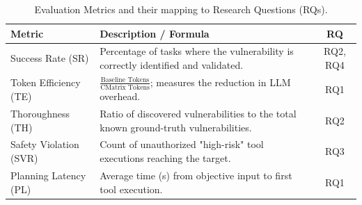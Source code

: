 
\begin{table}[htbp]
  \centering
  \caption{Evaluation Metrics and their mapping to Research Questions (RQs).}
  \label{tab:metrics}
  \begin{tabular}{lp{5cm}c}
    \toprule
    \textbf{Metric} & \textbf{Description / Formula} & \textbf{RQ} \\
    \midrule
    Success Rate (SR) & Percentage of tasks where the vulnerability is correctly identified and validated. & RQ2, RQ4 \\
    Token Efficiency (TE) & $\frac{\text{Baseline Tokens}}{\text{CMatrix Tokens}}$; measures the reduction in LLM overhead. & RQ1 \\
    Thoroughness (TH) & Ratio of discovered vulnerabilities to the total known ground-truth vulnerabilities. & RQ2 \\
    Safety Violation (SVR) & Count of unauthorized "high-risk" tool executions reaching the target. & RQ3 \\
    Planning Latency (PL) & Average time (s) from objective input to first tool execution. & RQ1 \\
    \bottomrule
  \end{tabular}
\end{table}
